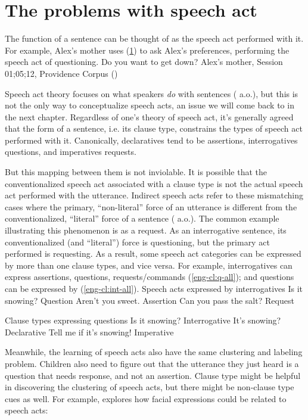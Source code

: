 \section{The problems with speech act}
The function of a sentence can be thought of as the speech act performed with it. For example, Alex's mother uses (\ref{}) to ask Alex's preferences, performing the speech act of questioning.
\bex{}
Do you want to get down? \hfill Alex's mother, Session 01;05;12, Providence Corpus (\cite{ProvidenceCorpus})
\eex

Speech act theory focuses on what speakers \emph{do} with sentences (\cite{austin1975things, searle1969} a.o.), but this is not the only way to conceptualize speech acts, an issue we will come back to in the next chapter. Regardless of one's theory of speech act, it's generally agreed that the form of a sentence, i.e. its clause type, constrains the types of speech act performed with it. Canonically, declaratives tend to be assertions, interrogatives questions, and imperatives requests. 


But this mapping between them is not inviolable. It is possible that the conventionalized speech act associated with a clause type is not the actual speech act performed with the utterance. Indirect speech acts refer to these mismatching cases where the primary, ``non-literal'' force of an utterance is different from the conventionalized, ``literal'' force of a sentence (\citealt{searle1975tax, searle1976class, bachharnish1979, levinson1983, searlevanderveken1985, portner2018, starr2014, murraystarr2020} a.o.). The common example illustrating this phenomenon is  as a request. As an interrogative sentence, its conventionalized (and ``literal'') force is questioning, but the primary act performed is requesting. As a result, some speech act categories can be expressed by more than one clause types, and vice versa. For example, interrogatives can express assertions, questions, requests/commands (\ref{eng-cl:q-all}); and questions can be expressed by \diis{} (\ref{eng-cl:int-all}).
Speech acts expressed by interrogatives 
\bxl Is it snowing? \hfill Question
\ex Aren't you sweet. \hfill Assertion
\ex Can you pass the salt? \hfill Request
\exl
\eex

Clause types expressing questions
\bxl
Is it snowing? \hfill Interrogative
\ex It's snowing? \hfill Declarative
\ex Tell me if it's snowing! \hfill Imperative
\exl
\eex


Meanwhile, the learning of speech acts also have the same clustering and labeling problem. Children also need to figure out that the utterance they just heard is a question that needs response, and not an assertion. Clause type might be helpful in discovering the clustering of speech acts, but there might be non-clause type cues as well. For example, \cite{} explores how facial expressions could be related to speech acts:%


